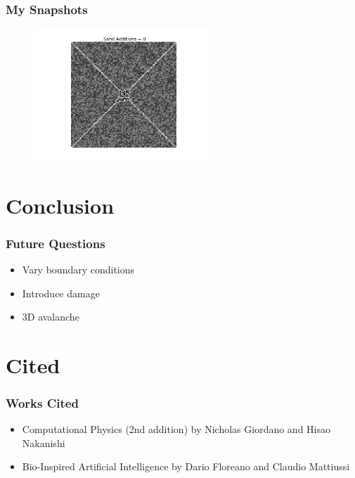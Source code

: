 \documentclass{beamer}
\begin{document}
\frame
{
  \frametitle{My Snapshots}
    
   \begin{figure}
   \includegraphics[width = 250]{blackcenter23}
   \end{figure}
}



\section{Conclusion}
\frame
{
  \frametitle{Future Questions}

  \begin{itemize}
  \item Vary boundary conditions
  \item Introduce damage
  \item 3D avalanche
  \end{itemize}
 
 }


\section{Cited}
\frame
{
  \frametitle{Works Cited}

  \begin{itemize}
  \item Computational Physics (2nd addition) by Nicholas Giordano and Hisao Nakanishi
  \item Bio-Inspired Artificial Intelligence by Dario Floreano and Claudio Mattiussi
  \end{itemize}
}
\end{document}
